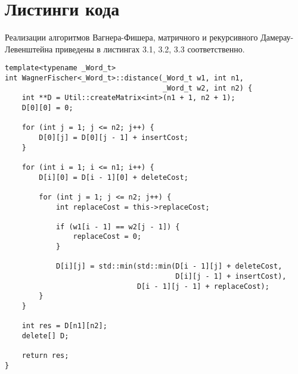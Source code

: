 \section{Листинги кода}
Реализации алгоритмов Вагнера-Фишера, матричного и рекурсивного Дамерау-Левенштейна приведены в листингах 3.1, 3.2, 3.3 соответственно.

\noindent\begin{minipage}{\textwidth}
\begin{lstlisting}[caption=Расстояние Левенштейна (матричная реализация)]
template<typename _Word_t>
int WagnerFischer<_Word_t>::distance(_Word_t w1, int n1,
                                     _Word_t w2, int n2) {
    int **D = Util::createMatrix<int>(n1 + 1, n2 + 1);
    D[0][0] = 0;

    for (int j = 1; j <= n2; j++) {
        D[0][j] = D[0][j - 1] + insertCost;
    }

    for (int i = 1; i <= n1; i++) {
        D[i][0] = D[i - 1][0] + deleteCost;

        for (int j = 1; j <= n2; j++) {
            int replaceCost = this->replaceCost;

            if (w1[i - 1] == w2[j - 1]) {
                replaceCost = 0;
            }

            D[i][j] = std::min(std::min(D[i - 1][j] + deleteCost,
                                        D[i][j - 1] + insertCost),
                               D[i - 1][j - 1] + replaceCost);
        }
    }

    int res = D[n1][n2];
    delete[] D;

    return res;
}
\end{lstlisting}
\end{minipage}

